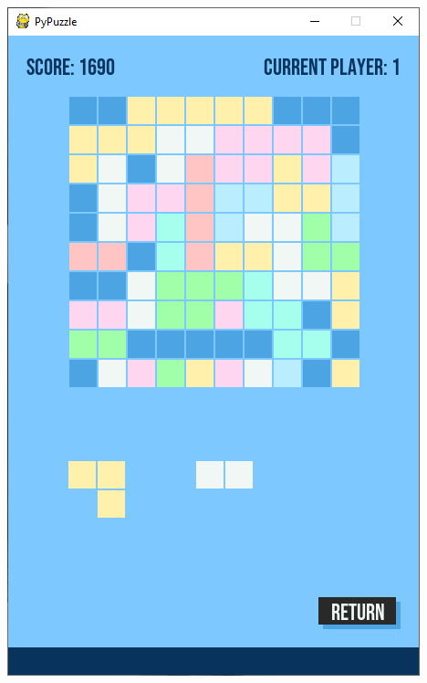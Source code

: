 \documentclass[a4paper]{report}
\begin{document}
\begin{enumerate}
        \includegraphics[scale=0.3]{images/3-ingame.png}

\end{enumerate}
\end{document}
